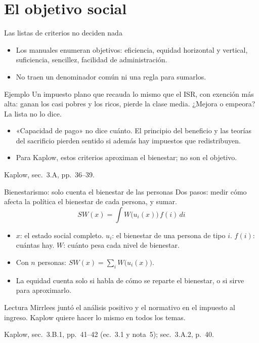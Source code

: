 \documentclass[aspectratio=169,11pt]{beamer}
\newcommand{\fuente}[1]{\par\vfill{\small\color{cGris}#1\par}}
\begin{document}
\section{El objetivo social}

\begin{frame}{Las listas de criterios no deciden nada}
  \begin{itemize}
    \item Los manuales enumeran objetivos: eficiencia, equidad horizontal y vertical, suficiencia, sencillez, facilidad de administración.
    \item No traen un denominador común ni una regla para sumarlos.
  \end{itemize}
  \pause
  \begin{block}{Ejemplo}
    Un impuesto plano que recauda lo mismo que el ISR, con exención más alta: ganan los casi pobres y los ricos, pierde la clase media. ¿Mejora o empeora? La lista no lo dice.
  \end{block}
  \pause
  \begin{itemize}
    \item «Capacidad de pago» no dice cuánto. El principio del beneficio y las teorías del sacrificio pierden sentido si además hay impuestos que redistribuyen.
    \item Para Kaplow, estos criterios aproximan el bienestar; no son el objetivo.
  \end{itemize}
  \fuente{Kaplow, sec.~3.A, pp.~36--39.}
\end{frame}

\begin{frame}{Bienestarismo: solo cuenta el bienestar de las personas}
  Dos pasos: medir cómo afecta la política el bienestar de cada persona, y sumar.
  \[
    SW(x) = \int W\big(u_i(x)\big)\, f(i)\, di
  \]
  \begin{itemize}
    \item $x$: el estado social completo. $u_i$: el bienestar de una persona de tipo $i$. $f(i)$: cuántas hay. $W$: cuánto pesa cada nivel de bienestar.
    \item Con $n$ personas: $SW(x) = \sum_i W\big(u_i(x)\big)$.
  \end{itemize}
  \pause
  \begin{itemize}
    \item La equidad cuenta solo si habla de cómo se reparte el bienestar, o si sirve para aproximarlo.
  \end{itemize}
  \pause
  \begin{block}{Lectura}
    Mirrlees juntó el análisis positivo y el normativo en el impuesto al ingreso. Kaplow quiere hacer lo mismo en todos los temas.
  \end{block}
  \fuente{Kaplow, sec.~3.B.1, pp.~41--42 (ec.~3.1 y nota~5); sec.~3.A.2, p.~40.}
\end{frame}
\end{document}
